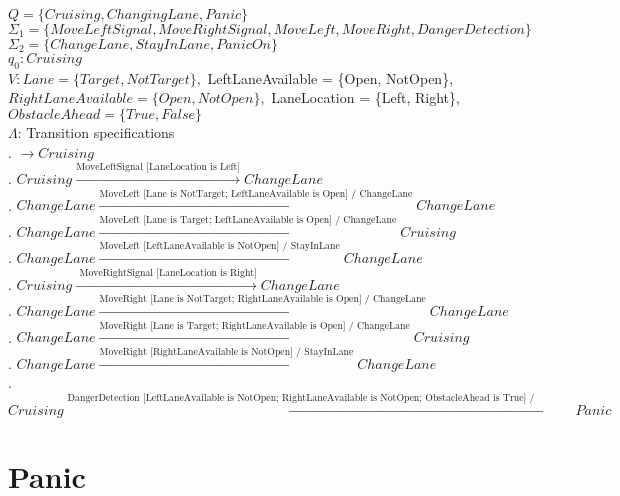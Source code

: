 \documentclass[12pt]{article}
\begin{document}
\begin{spacing}{1.5}
\noindent $Q = \{Cruising, ChangingLane, Panic\}$\\
\noindent $\Sigma_1 = \{MoveLeftSignal, MoveRightSignal, MoveLeft, MoveRight, DangerDetection\}$\\
\noindent $\Sigma_2 = \{ChangeLane, StayInLane, PanicOn\}$\\
\noindent $q_0: Cruising$\\
\noindent $V: Lane = \{Target, NotTarget\}, $ LeftLaneAvailable  = \{Open, NotOpen\}, $ RightLaneAvailable  = \{Open, NotOpen\}, $ LaneLocation  = \{Left, Right\}, $ ObstacleAhead  = \{True, False\}$\\
\noindent $\Lambda$: Transition specifications\\

. $\rightarrow Cruising$\\
. $Cruising \xrightarrow {\text {MoveLeftSignal [LaneLocation is Left]}} ChangeLane$\\
. $ChangeLane \xrightarrow {\text {MoveLeft [Lane is NotTarget; LeftLaneAvailable is Open] / ChangeLane}} ChangeLane$\\
. $ChangeLane \xrightarrow {\text {MoveLeft [Lane is Target; LeftLaneAvailable is Open] / ChangeLane}} Cruising$\\
. $ChangeLane \xrightarrow {\text {MoveLeft [LeftLaneAvailable  is NotOpen] / StayInLane}} ChangeLane$\\
. $Cruising \xrightarrow {\text { MoveRightSignal [LaneLocation is Right]}} ChangeLane$\\
. $ChangeLane \xrightarrow {\text {MoveRight [Lane is NotTarget; RightLaneAvailable is Open] / ChangeLane}} ChangeLane$\\
. $ChangeLane \xrightarrow {\text {MoveRight [Lane is Target; RightLaneAvailable is Open] / ChangeLane}} Cruising$\\
. $ChangeLane \xrightarrow {\text {MoveRight [RightLaneAvailable is NotOpen] / StayInLane}} ChangeLane$\\
. $Cruising \xrightarrow {\text {DangerDetection [LeftLaneAvailable is NotOpen; RightLaneAvailable is NotOpen; ObstacleAhead is True] / (PanicModeOn)}} Panic$\\


\newpage

\section{Panic}


\end{spacing}
\end{document}
